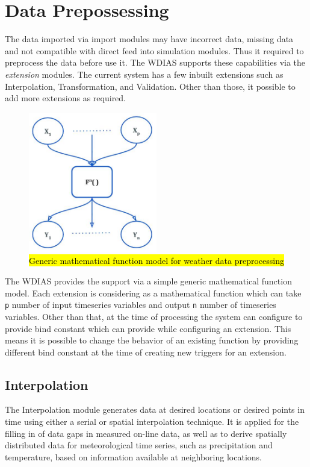 \section{Data Prepossessing}
\label{se:data_preprocess}

The data imported via import modules may have incorrect data, missing data and not compatible with direct feed into simulation modules. 
Thus it required to preprocess the data before use it. The WDIAS supports these capabilities via the \emph{extension} modules. The current system has a few inbuilt extensions such as Interpolation, Transformation, and Validation. Other than those, it possible to add more extensions as required.
\begin{figure}[htp]
    \centering
    \includegraphics[width=0.5\textwidth]{method/data_preprocess/weather_data_preprocessing.jpg}
    \caption{\hl{Generic mathematical function model for weather data preprocessing}}
    \label{fi:weather_data_preprocessing}
\end{figure}

The WDIAS provides the support via a simple generic mathematical function model. Each extension is considering as a mathematical function which can take \texttt{p} number of input timeseries variables and output \texttt{n} number of timeseries variables. Other than that, at the time of processing the system can configure to provide bind constant which can provide while configuring an extension. This means it is possible to change the behavior of an existing function by providing different bind constant at the time of creating new triggers for an extension.

\subsection{Interpolation}
The Interpolation module generates data at desired locations or desired points in time using either a serial or spatial interpolation technique. It is applied for the filling in of data gaps in measured on-line data, as well as to derive spatially distributed data for meteorological time series, such as precipitation and temperature, based on information available at neighboring locations.

